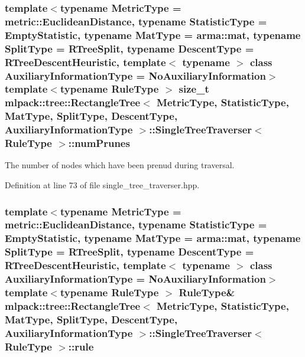 \subsubsection[{num\+Prunes}]{\setlength{\rightskip}{0pt plus 5cm}template$<$typename Metric\+Type  = metric\+::\+Euclidean\+Distance, typename Statistic\+Type  = Empty\+Statistic, typename Mat\+Type  = arma\+::mat, typename Split\+Type  = R\+Tree\+Split, typename Descent\+Type  = R\+Tree\+Descent\+Heuristic, template$<$ typename $>$ class Auxiliary\+Information\+Type = No\+Auxiliary\+Information$>$ template$<$typename Rule\+Type $>$ size\+\_\+t {\bf mlpack\+::tree\+::\+Rectangle\+Tree}$<$ Metric\+Type, Statistic\+Type, Mat\+Type, {\bf Split\+Type}, {\bf Descent\+Type}, Auxiliary\+Information\+Type $>$\+::{\bf Single\+Tree\+Traverser}$<$ Rule\+Type $>$\+::num\+Prunes\hspace{0.3cm}{\ttfamily [private]}}\label{classmlpack_1_1tree_1_1RectangleTree_1_1SingleTreeTraverser_a2a4cf8b17057a1d2d805176c5e97b408}


The number of nodes which have been prenud during traversal. 



Definition at line 73 of file single\+\_\+tree\+\_\+traverser.\+hpp.

\subsubsection[{rule}]{\setlength{\rightskip}{0pt plus 5cm}template$<$typename Metric\+Type  = metric\+::\+Euclidean\+Distance, typename Statistic\+Type  = Empty\+Statistic, typename Mat\+Type  = arma\+::mat, typename Split\+Type  = R\+Tree\+Split, typename Descent\+Type  = R\+Tree\+Descent\+Heuristic, template$<$ typename $>$ class Auxiliary\+Information\+Type = No\+Auxiliary\+Information$>$ template$<$typename Rule\+Type $>$ Rule\+Type\& {\bf mlpack\+::tree\+::\+Rectangle\+Tree}$<$ Metric\+Type, Statistic\+Type, Mat\+Type, {\bf Split\+Type}, {\bf Descent\+Type}, Auxiliary\+Information\+Type $>$\+::{\bf Single\+Tree\+Traverser}$<$ Rule\+Type $>$\+::rule\hspace{0.3cm}{\ttfamily [private]}}\label{classmlpack_1_1tree_1_1RectangleTree_1_1SingleTreeTraverser_a9c66d3216923a24966bbeed9aa1f582e}


